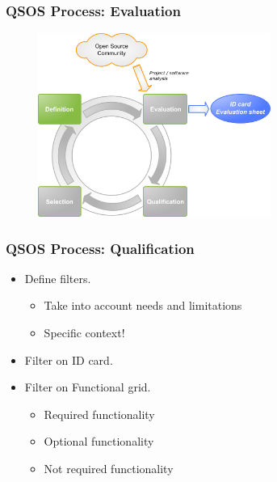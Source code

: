 \documentclass{beamer}
\begin{document}

\begin{frame}
\frametitle{QSOS Process: Evaluation}
\begin{center}
\begin{figure}
 \includegraphics[height=6cm]{figs/QSOS_Process_Evaluation.png}
\end{figure}
\end{center}
\end{frame}


\begin{frame}
 \frametitle{QSOS Process: Qualification}
 \begin{itemize}
 \item Define filters.
    \begin{itemize}
     \item Take into account needs and limitations
     \item Specific context!
    \end{itemize}

 \item Filter on ID card.
 \item Filter on Functional grid.
    \begin{itemize}
     \item Required functionality
     \item Optional functionality
     \item Not required functionality
    \end{itemize}

 \end{itemize}
\end{frame}

\end{document}
